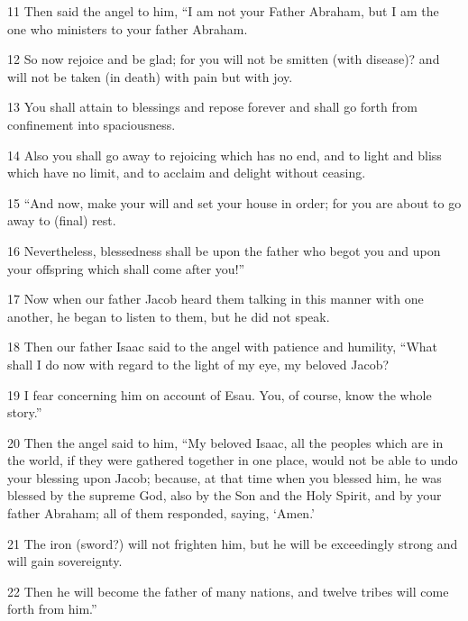 \par 11 Then said the angel to him, “I am not your Father Abraham, but I am the one who ministers to your father Abraham. 

\par 12 So now rejoice and be glad; for you will not be smitten (with disease)? and will not be taken (in death) with pain but with joy. 

\par 13 You shall attain to blessings and repose forever and shall go forth from confinement into spaciousness. 

\par 14 Also you shall go away to rejoicing which has no end, and to light and bliss which have no limit, and to acclaim and delight without ceasing. 

\par 15 “And now, make your will and set your house in order; for you are about to go away to (final) rest.

\par 16 Nevertheless, blessedness shall be upon the father who begot you and upon your offspring which shall come after you!”

\par 17 Now when our father Jacob heard them talking in this manner with one another, he began to listen to them, but he did not speak. 

\par 18 Then our father Isaac said to the angel with patience and humility, “What shall I do now with regard to the light of my eye, my beloved Jacob?

\par 19 I fear concerning him on account of Esau. You, of course, know the whole story.”

\par 20 Then the angel said to him, “My beloved Isaac, all the peoples which are in the world, if they were gathered together in one place, would not be able to undo your blessing upon Jacob; because, at that time when you blessed him, he was blessed by the supreme God, also by the Son and the Holy Spirit, and by your father Abraham; all of them responded, saying, ‘Amen.’ 

\par 21 The iron (sword?) will not frighten him, but he will be exceedingly strong and will gain sovereignty. 

\par 22 Then he will become the father of many nations, and twelve tribes will come forth from him.” 

